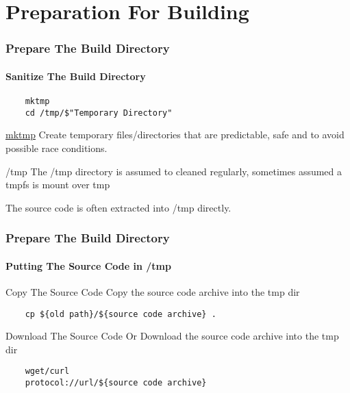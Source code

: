 \documentclass[12pt,hyperref={pdfpagelabels=true}]{beamer}
\begin{document}
\section{Preparation For Building}

\begin{frame}[fragile]
  \frametitle{Prepare The Build Directory}
  \framesubtitle{Sanitize The Build Directory}
  \lstset{language=sh}
  \begin{lstlisting}
    mktmp
    cd /tmp/$"Temporary Directory"
  \end{lstlisting}
  
  \pause
  
  \begin{alertblock}{\href{http://unixhelp.ed.ac.uk/CGI/man-cgi?mktemp}{mktmp}}
    Create temporary files/directories that are predictable, safe and to avoid
    possible race conditions.
  \end{alertblock}
  
  \pause

  \begin{alertblock}{/tmp}
    The /tmp directory is assumed to cleaned regularly, sometimes assumed a
    tmpfs is mount over tmp
    
    The source code is often extracted into /tmp directly.
  \end{alertblock}
\end{frame}

\begin{frame}[fragile]
  \frametitle{Prepare The Build Directory}
  \framesubtitle{Putting The Source Code in /tmp}
  \lstset{language=sh}
  \begin{block}{Copy The Source Code}
    Copy the source code archive into the tmp dir
  \end{block}
  
  \pause
  
  \begin{lstlisting}
    cp ${old path}/${source code archive} .
  \end{lstlisting}
  
  \pause
  
  \begin{block}{Download The Source Code}
    Or Download the source code archive into the tmp dir
  \end{block}
  
  \pause
  
  \begin{lstlisting}
    wget/curl
    protocol://url/${source code archive}
  \end{lstlisting}
\end{frame}
\end{document}
